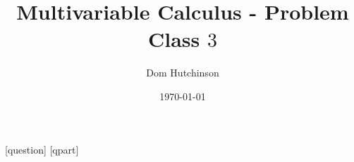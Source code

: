 \documentclass[11pt,a4paper]{article}
\begin{document}
\pagestyle{fancy}
\setlength\parindent{0pt}
\allowdisplaybreaks

[question]
[qpart]

\newcommand{\nats}{\mathbb{N}}
\newcommand{\real}{\mathbb{R}}
\newcommand{\newquestion} {\stepcounter{question}}
\newcommand{\newqpart} {\stepcounter{qpart}}
\newcommand{\newqqpart} {\stepcounter{qqpart}}
\newcommand{\question}[2] {\newquestion \ifquestions \textbf{Question \arabic{question} - #1}\\ #2\\ \fi}
\newcommand{\Qpart}[1] {\newquestion\newqpart \ifquestions \textbf{Question \arabic{question}.\arabic{qpart}}\\ #1\\ \fi}
\newcommand{\qpart}[1] {\newqpart \ifquestions \textbf{Question \arabic{question}.\arabic{qpart}}\\ #1\\ \fi}
\newcommand{\qqpart}[1] {\newqqpart \ifquestions \textbf{Question \arabic{question}.\arabic{qpart}.\arabic{qqpart}}\\ #1\\ \fi}
\newcommand{\solution}[1] {\ifsolutions\textbf{My Solution \arabic{question}}\\ #1\\ \fi}
\newcommand{\spart}[1] {\ifsolutions\textbf{My Solution \arabic{question}.\arabic{qpart}}\\ #1\\ \fi}
\newcommand{\sspart}[1] {\ifsolutions\textbf{My Solution \arabic{question}.\arabic{qpart}.\arabic{qqpart}}\\ #1 \fi}
\newcommand{\doubleplus} {+\kern-1.3ex+\kern0.8ex}
\renewcommand{\headrulewidth}{0pt}

  {\lstset{mathescape=true,xleftmargin=.1\textwidth}}
  {}

\newif\ifquestions
\questionstrue
\newif\ifsolutions
\solutionstrue

\title{Multivariable Calculus - Problem Class $3$}
\author{Dom Hutchinson}
\date{\today}
\maketitle

\fancyhead[R]{\today}
\end{document}
